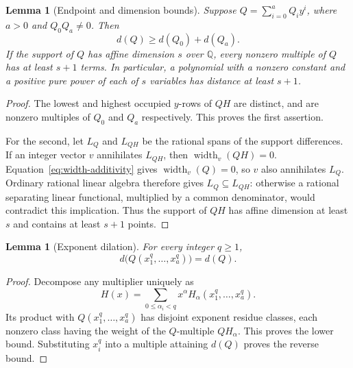 \documentclass[11pt]{article}
\numberwithin{equation}{section}
\newtheorem{lemma}[theorem]{Lemma}
\theoremstyle{definition}\newtheorem{definition}[theorem]{Definition}
\theoremstyle{remark}\newtheorem{remark}[theorem]{Remark}
\begin{document}
\begin{lemma}[Endpoint and dimension bounds]\label{lem:endpoints}
Suppose $Q=\sum_{i=0}^aQ_iy^i$, where $a>0$ and $Q_0Q_a\ne0$.
Then
\[
 d(Q)\ge d(Q_0)+d(Q_a).
\]
If the support of $Q$ has affine dimension $s$ over $\mathbb Q$,
every nonzero multiple of $Q$ has at least $s+1$ terms.
In particular, a polynomial with a nonzero constant and a positive
pure power of each of $s$ variables has distance at least $s+1$.
\end{lemma}
\begin{proof}
The lowest and highest occupied $y$-rows of $QH$ are distinct,
and are nonzero multiples of $Q_0$ and $Q_a$ respectively. This
proves the first assertion.

For the second, let $L_Q$ and $L_{QH}$ be the rational spans of the
support differences. If an integer vector $v$ annihilates $L_{QH}$,
then $\operatorname{width}_v(QH)=0$. Equation~\eqref{eq:width-additivity}
gives $\operatorname{width}_v(Q)=0$, so $v$ also annihilates $L_Q$.
Ordinary rational linear algebra therefore gives $L_Q\subseteq L_{QH}$:
otherwise a rational separating linear functional, multiplied by a
common denominator, would contradict this implication.
Thus the support of $QH$ has affine dimension at least $s$ and
contains at least $s+1$ points.
\end{proof}

\begin{lemma}[Exponent dilation]\label{lem:exponent-dilation}
For every integer $q\ge1$,
\[
 d\bigl(Q(x_1^q,\ldots,x_a^q)\bigr)=d(Q).
\]
\end{lemma}
\begin{proof}
Decompose any multiplier uniquely as
\[
 H(x)=\sum_{0\le\alpha_i<q}x^\alpha H_\alpha(x_1^q,\ldots,x_a^q).
\]
Its product with $Q(x_1^q,\ldots,x_a^q)$ has disjoint exponent
residue classes, each nonzero class having the weight of the
$Q$-multiple $QH_\alpha$. This proves the lower bound. Substituting
$x_i^q$ into a multiple attaining $d(Q)$ proves the reverse bound.
\end{proof}
\end{document}
